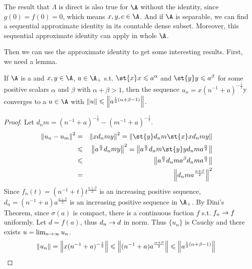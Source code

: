 \begin{rem}
	The result that $\Lambda$ is direct is also true for $\A$ without the identity, since $g(0)=f(0)=0$, which means $x, y, c \in \A$. And if $\A$ is separable, we can find a sequential approximate identity in its countable dense subset. Moreover, this sequential approximate identity can apply in whole $\A$.
\end{rem}

Then we can use the approximate identity to get some interesting results. First, we need a lemma.

\begin{lem}
	If $\A$ is a \Cs and $x,y \in \A$, $a \in \A_{+}$ s.t. $\st{x}x \leqslant a^{\alpha}$ and $\st{y}y \leqslant a^{\beta}$ for some positive scalars $\alpha$ and $\beta$ with $\alpha + \beta > 1$, then the sequence $u_n = x(n^{-1}+a)^{-\frac{1}{2}}$y converges to a $u \in \A$ with $\left\lVert u\right\lVert \leqslant \left\lVert a^{\frac{1}{2}(\alpha+\beta-1)}\right\lVert$.
\end{lem}
\begin{proof}
	Let $d_nm = (n^{-1}+a)^{-\frac{1}{2}}-(m^{-1}+a)^{-\frac{1}{2}}$.
	\begin{eqnarray*}
		\norm{u_n-u_m}^2 &=& \norm{xd_nmy}^2 = \norm{\st{y}d_nm\st{x}xd_nmy} \\
		&\leqslant& \norm{a^{\frac{\alpha}{2}}d_nmy}^2 = \norm{a^{\frac{\alpha}{2}}d_nm\st{y}yd_nma^{\frac{\alpha}{2}}} \\
		&\leqslant& \norm{a^{\frac{\alpha}{2}}d_nm a^{\beta} d_nma^{\frac{\alpha}{2}}} \\
		&=& \norm{d_nm a^{\frac{\alpha+\beta}{2}}}^2
	\end{eqnarray*}
	Since $f_n(t) = (n^{-1}+t)t^{\frac{\alpha+\beta}{2}}$ is an increasing positive sequence, $d_n=(n^{-1}+a)a^{\frac{\alpha+\beta}{2}}$ is an increasing positive sequence in $\A_{+}$. By Dini's Theorem, since $\sigma(a)$ is compact, there is a continuous fuction $f$ s.t. $f_n \rightarrow f$ uniformly. Let $d = f(a)$, thus $d_n \rightarrow d$ in norm. Thus $\{u_n\}$ is Cauchy and there exists $u = \lim_{n \rightarrow \infty} u_n$.
	\begin{equation*}
		\left\lVert u_n\right\lVert = \left\lVert x(n^{-1}+a)^{-\frac{1}{2}}\right\lVert \leqslant \left\lVert(n^{-1}+a)a^{\frac{\alpha+\beta}{2}}\right\lVert \leqslant \left\lVert a^{\frac{1}{2}(\alpha+\beta-1)}\right\lVert \qedhere
	\end{equation*}
\end{proof}


